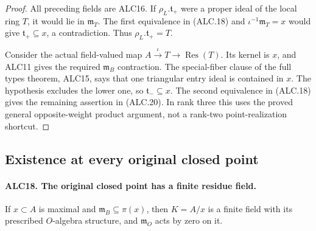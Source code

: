 \documentclass[11pt,a4paper]{article}
\numberwithin{equation}{section}
\theoremstyle{remark}\newtheorem{remark}[theorem]{Remark}
\begin{document}
\begin{proof}
All preceding fields are ALC16.  If
\(\rho_L.\mathfrak t_+\) were a proper ideal of the local
ring \(T\), it would lie in \(\mathfrak m_T\).
The first equivalence in (ALC.18) and
\(\iota^{-1}\mathfrak m_T=x\) would give
\(\mathfrak t_+\subseteq x\), a contradiction.
Thus \(\rho_L.\mathfrak t_+=T\).

Consider the actual field-valued map
\(A\xrightarrow{\iota}T\to\operatorname{Res}(T)\).
Its kernel is \(x\), and ALC11 gives the required
\(\mathfrak m_B\) contraction.  The special-fiber clause
of the full types theorem, ALC15, says that one triangular
entry ideal is contained in \(x\).  The hypothesis excludes
the lower one, so \(\mathfrak t_-\subseteq x\).
The second equivalence in (ALC.18) gives the remaining
assertion in (ALC.20).  In rank three this uses the proved
general opposite-weight product argument, not a rank-two
point-realization shortcut.
\end{proof}

\subsection{Existence at every original closed point}

\paragraph{ALC18. The original closed point has a finite residue field.}
\label{claim:ALC18}
If \(x\subset A\) is maximal and
\(\mathfrak m_B\subseteq\pi(x)\), then \(K=A/x\)
is a finite field with its prescribed \(O\)-algebra
structure, and \(\mathfrak m_O\) acts by zero on it.
\end{document}
